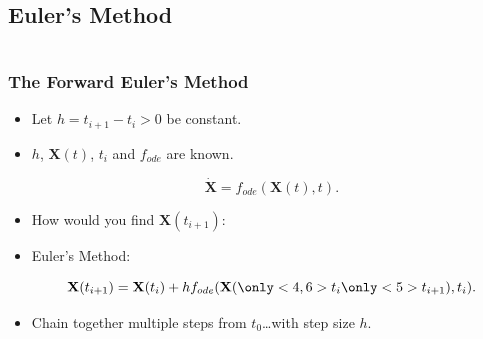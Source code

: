 \documentclass{beamer}
\begin{document}
\subsection{Euler's Method}

\begin{frame}
\begin{columns}
\begin{column}{0.5\linewidth}
\frametitle{The Forward Euler's Method}
\begin{itemize}
\item<1-> Let $h=t_{i+1}-t_i>0$ be constant.

\item<2-> $h$, $\mathbf{X}(t)$, $t_i$ and $f_{ode}$ are known.

\begin{equation*}
\dot{\mathbf{X}} = f_{ode}(\mathbf{X}(t),t).
\end{equation*}

\item<3-> How would you find $\mathbf{X}(t_{i+1})$:

\item<4->  Euler's Method:

\begin{equation*}
\mathbf{X}(t_{i+1}) = \mathbf{X}(t_{i})+h f_{ode}(\mathbf{X}(\only<4,6>{t_i}\only<5>{t_{i+1}}),t_i).
\end{equation*}

\item<6-> Chain together multiple steps from $t_0$\ldots with step size $h$.


\end{itemize}
\end{column}
\end{columns}
\end{frame}
\end{document}
